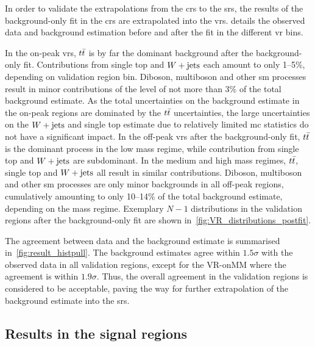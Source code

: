 

In order to validate the extrapolations from the \glspl{cr} to the \glspl{sr}, the results of the background-only fit in the \glspl{cr} are extrapolated into the \glspl{vr}.  details the observed data and background estimation before and after the fit in the different \gls{vr} bins. 

In the on-peak \glspl{vr}, $t\bar{t}$ is by far the dominant background after the background-only fit. Contributions from single top and $W+\mathrm{jets}$ each amount to only 1--5\%, depending on validation region bin. Diboson, multiboson and other \gls{sm} processes result in minor contributions of the level of not more than 3\% of the total background estimate. As the total uncertainties on the background estimate in the on-peak regions are dominated by the $t\bar{t}$ uncertainties, the large uncertainties on the $W+\mathrm{jets}$ and single top estimate due to relatively limited \gls{mc} statistics do not have a significant impact. 
In the off-peak \glspl{vr} after the background-only fit, $t\bar{t}$ is the dominant process in the low mass regime, while contribution from single top and $W+\mathrm{jets}$ are subdominant. In the medium and high mass regimes, $t\bar{t}$, single top and $W+\mathrm{jets}$ all result in similar contributions. Diboson, multiboson and other \gls{sm} processes are only minor backgrounds in all off-peak regions, cumulatively amounting to only 10--14\% of the total background estimate, depending on the mass regime.
Exemplary $N-1$ distributions in the validation regions after the background-only fit are shown in~\cref{fig:VR_distributions_postfit}.

The agreement between data and the background estimate is summarised in~\cref{fig:result_histpull}.  The background estimates agree within $1.5\sigma$ with the observed data in all validation regions, except for the VR-onMM where the agreement is within $1.9\sigma$. Thus, the overall agreement in the validation regions is considered to be acceptable, paving the way for further extrapolation of the background estimate into the \glspl{sr}.

\subsection{Results in the signal regions}

